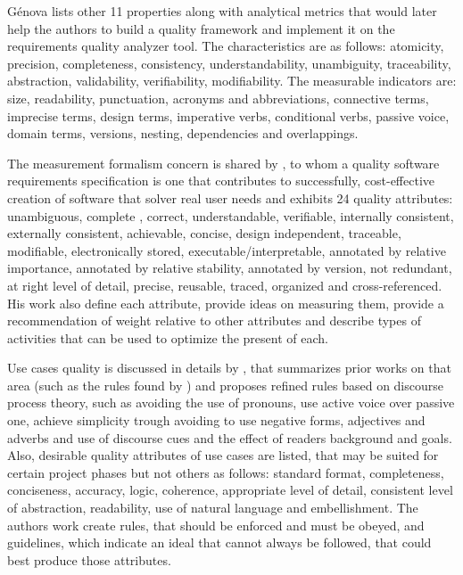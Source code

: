 G{\'e}nova \cite{Genova_2013} lists other 11 properties along with analytical metrics that would later help the authors to build a quality framework and implement it on the requirements quality analyzer tool. The characteristics are as follows: atomicity, precision, completeness, consistency, understandability, unambiguity, traceability, abstraction, validability, verifiability, modifiability. The measurable indicators are: size, readability, punctuation, acronyms and abbreviations, connective terms, imprecise terms, design terms, imperative verbs, conditional verbs, passive voice, domain terms, versions, nesting, dependencies and overlappings.

The measurement formalism concern is shared by \cite{Davis_1993}, to whom a quality software requirements specification is one that contributes to successfully, cost-effective creation of software that solver real user needs and exhibits 24 quality attributes: unambiguous, complete , correct, understandable, verifiable, internally consistent, externally consistent, achievable, concise, design independent, traceable, modifiable, electronically stored, executable/interpretable, annotated by relative importance, annotated by relative stability, annotated by version, not redundant, at right level of detail, precise, reusable, traced, organized and cross-referenced. His work also define each attribute, provide ideas on measuring them, provide a recommendation of weight relative to other attributes and describe types of activities that can be used to optimize the present of each.

Use cases quality is discussed in details by \cite{Phalp_2011}, that summarizes prior works on that area (such as the rules found by \cite{Cockburn_2000}) and proposes refined rules based on discourse process theory, such as avoiding the use of pronouns, use active voice over passive one, achieve simplicity trough avoiding to use negative forms, adjectives and adverbs and use of discourse cues and the effect of readers background and goals. Also, desirable quality attributes of use cases are listed, that may be suited for certain project phases but not others as follows: standard format, completeness, conciseness, accuracy, logic, coherence, appropriate level of detail, consistent level of abstraction, readability, use of natural language and embellishment. The authors work create rules, that should be enforced and must be obeyed, and guidelines, which indicate an ideal that cannot always be followed, that could best produce those attributes. 

